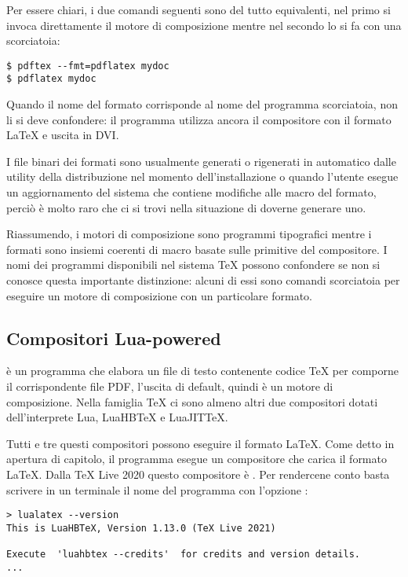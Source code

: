 Per essere chiari, i due comandi seguenti sono del tutto equivalenti, nel primo
si invoca direttamente il motore di composizione mentre nel secondo lo si fa con
una scorciatoia:
\begin{Verbatim}[numbers=none]
$ pdftex --fmt=pdflatex mydoc
$ pdflatex mydoc
\end{Verbatim}

Quando il nome del formato corrisponde al nome del programma scorciatoia, non li
si deve confondere: il programma  utilizza ancora il compositore
 con il formato \LaTeX{} e uscita in DVI.

I file binari dei formati sono usualmente generati o rigenerati in automatico
dalle utility della distribuzione nel momento dell'installazione o quando
l'utente esegue un aggiornamento del sistema che contiene modifiche alle macro
del formato, perciò è molto raro che ci si trovi nella situazione di doverne
generare uno.

Riassumendo, i motori di composizione sono programmi tipografici mentre i
formati sono insiemi coerenti di macro basate sulle primitive del compositore. I
nomi dei programmi disponibili nel sistema \TeX{} possono confondere se non si
conosce questa importante distinzione: alcuni di essi sono comandi scorciatoia
per eseguire un motore di composizione con un particolare formato.


\subsection{Compositori Lua-powered}

\LuaTeX{} è un programma che elabora un file di testo contenente codice \TeX{}
per comporne il corrispondente file PDF, l'uscita di default, quindi è un motore
di composizione. Nella famiglia \TeX{} ci sono almeno altri due compositori
dotati dell'interprete Lua, LuaHB\TeX{} e LuaJIT\TeX{}.

Tutti e tre questi compositori possono eseguire il formato \LaTeX. Come detto in
apertura di capitolo, il programma  esegue un compositore che
carica il formato \LaTeX. Dalla TeX Live 2020 questo compositore è
. Per rendercene conto basta scrivere in un terminale il nome del
programma con l'opzione :
\begin{Verbatim}[numbers=none]
> lualatex --version
This is LuaHBTeX, Version 1.13.0 (TeX Live 2021)

Execute  'luahbtex --credits'  for credits and version details.
...
\end{Verbatim}

